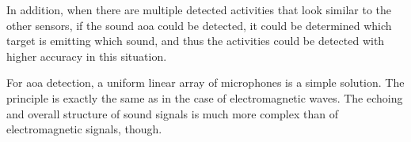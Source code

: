In addition,
when there are multiple detected activities 
that look similar to the other sensors,
if the sound \gls{aoa} could be detected,
it could be determined which target is emitting which sound,
and thus the activities could be detected with higher accuracy in this situation.

For \gls{aoa} detection,
a uniform linear array of microphones is a simple solution.
The principle is exactly the same as in the case of electromagnetic waves.
The echoing and overall structure of sound signals is much more complex than
of electromagnetic signals, though.




